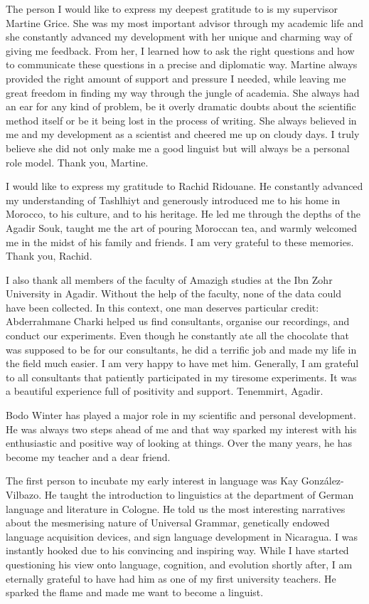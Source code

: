
The person I would like to express my deepest gratitude to is my supervisor Martine Grice. She was my most important advisor through my academic life and she constantly advanced my development with her unique and charming way of giving me feedback. From her, I learned how to ask the right questions and how to communicate these questions in a precise and diplomatic way. Martine always provided the right amount of support and pressure I needed, while leaving me great freedom in finding my way through the jungle of academia. She always had an ear for any kind of problem, be it overly dramatic doubts about the scientific method itself or be it being lost in the process of writing. She always believed in me and my development as a scientist and cheered me up on cloudy days. I truly believe she did not only make me a good linguist but will always be a personal role model. Thank you, Martine.

I would like to express my gratitude to Rachid Ridouane. He constantly advanced my understanding of Tashlhiyt and generously introduced me to his home in Morocco, to his culture, and to his heritage. He led me through the depths of the Agadir Souk, taught me the art of pouring Moroccan tea, and warmly welcomed me in the midst of his family and friends. I am very grateful to these memories. Thank you, Rachid.

I also thank all members of the faculty of Amazigh studies at the Ibn Zohr University in Agadir. Without the help of the faculty, none of the data could have been collected. In this context, one man deserves particular credit: Abderrahmane Charki helped us find consultants, organise our recordings, and conduct our experiments. Even though he constantly ate all the chocolate that was supposed to be for our consultants, he did a terrific job and made my life in the field much easier. I am very happy to have met him. Generally, I am grateful to all consultants that patiently participated in my tiresome experiments. It was a beautiful experience full of positivity and support. Tenemmirt, Agadir.

Bodo Winter has played a major role in my scientific and personal development. He was always two steps ahead of me and that way sparked my interest with his enthusiastic and positive way of looking at things. Over the many years, he has become my teacher and a dear friend.

The first person to incubate my early interest in language was Kay González-Vilbazo. He taught the introduction to linguistics at the department of German language and literature in Cologne. He told us the most interesting narratives about the mesmerising nature of Universal Grammar, genetically endowed language acquisition devices, and sign language development in Nicaragua. I was instantly hooked due to his convincing and inspiring way. While I have started questioning his view onto language, cognition, and evolution shortly after, I am eternally grateful to have had him as one of my first university teachers. He sparked the flame and made me want to become a linguist. 


